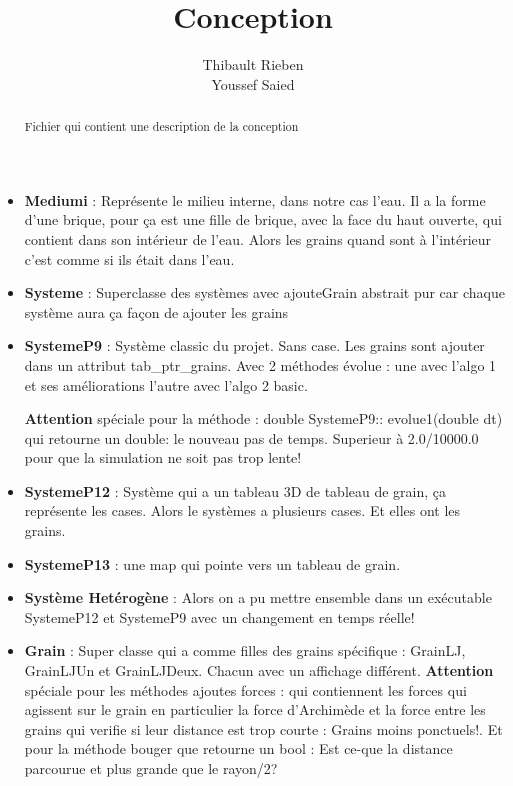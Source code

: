 \documentclass[a4paper,10pt]{article}
\title{Conception}
\author{Thibault Rieben \\ Youssef Saied}
\begin{document}
\maketitle

\begin{abstract}
	Fichier qui contient une description de la conception
\end{abstract}

\begin{itemize}
 \item \textbf{Mediumi}  : Représente le milieu interne, dans notre cas l'eau. Il a la forme d'une brique, pour ça est une fille de brique, avec la face du haut ouverte, qui contient dans son intérieur de l'eau. Alors les grains quand sont à l'intérieur c'est comme si ils était dans l'eau.
 	
 \item \textbf{Systeme} : Superclasse des systèmes avec ajouteGrain abstrait pur car chaque système aura ça façon de ajouter les grains
 
 \item \textbf{SystemeP9} : Système classic du projet. Sans case. Les grains sont ajouter dans un attribut tab\_ptr\_grains.
 Avec 2 méthodes évolue : une avec l'algo 1 et ses améliorations l'autre avec l'algo 2 basic.
 
 
 \textbf{Attention} spéciale pour la méthode : double SystemeP9:: evolue1(double dt) qui retourne un double: le nouveau pas de temps. Superieur à 2.0/10000.0 pour que la simulation ne soit pas trop lente!
 
 
 \item \textbf{SystemeP12} : Système qui a un tableau 3D de tableau de grain, ça représente les cases. Alors le systèmes a plusieurs cases. Et elles ont les grains.
 
 \item \textbf{SystemeP13} : une map qui pointe vers un tableau de grain.
 
 \item \textbf{Système Hetérogène} : Alors on a pu mettre ensemble dans un exécutable SystemeP12 et SystemeP9 avec un changement en temps réelle!
 
 \item \textbf{Grain} : Super classe qui a comme filles des grains spécifique : GrainLJ, GrainLJUn et GrainLJDeux. Chacun avec un affichage différent. \textbf{Attention} spéciale pour les méthodes ajoutes forces : qui contiennent les forces qui agissent sur le grain en particulier la force d’Archimède et la force entre les grains qui verifie si leur distance est trop courte : Grains moins ponctuels!.  Et pour la méthode bouger que retourne un bool :  Est ce-que la distance parcourue et plus grande que le rayon/2?
 

\end{itemize}
\end{document}
